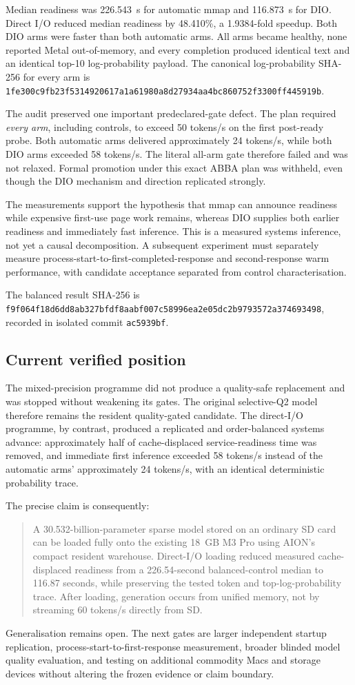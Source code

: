 Median readiness was 226.543~s for automatic mmap and 116.873~s for DIO.
Direct I/O reduced median readiness by 48.410\%, a 1.9384-fold speedup.  Both
DIO arms were faster than both automatic arms.  All arms became healthy, none
reported Metal out-of-memory, and every completion produced identical text and
an identical top-10 log-probability payload.  The canonical log-probability
SHA-256 for every arm is
\texttt{1fe300c9fb23f5314920617a1a61980a8d27934aa4bc860752f3300ff445919b}.

The audit preserved one important predeclared-gate defect.  The plan required
\emph{every arm}, including controls, to exceed 50 tokens/s on the first
post-ready probe.  Both automatic arms delivered approximately 24 tokens/s,
while both DIO arms exceeded 58 tokens/s.  The literal all-arm gate therefore
failed and was not relaxed.  Formal promotion under this exact ABBA plan was
withheld, even though the DIO mechanism and direction replicated strongly.

The measurements support the hypothesis that mmap can announce readiness
while expensive first-use page work remains, whereas DIO supplies both earlier
readiness and immediately fast inference.  This is a measured systems
inference, not yet a causal decomposition.  A subsequent experiment must
separately measure process-start-to-first-completed-response and second-response
warm performance, with candidate acceptance separated from control
characterisation.

The balanced result SHA-256 is
\texttt{f9f064f18d6dd8ab327bfdf8aabf007c58996ea2e05dc2b9793572a374693498},
recorded in isolated commit \texttt{ac5939bf}.

\subsection{Current verified position}

The mixed-precision programme did not produce a quality-safe replacement and
was stopped without weakening its gates.  The original selective-Q2 model
therefore remains the resident quality-gated candidate.  The direct-I/O
programme, by contrast, produced a replicated and order-balanced systems
advance: approximately half of cache-displaced service-readiness time was
removed, and immediate first inference exceeded 58 tokens/s instead of the
automatic arms' approximately 24 tokens/s, with an identical deterministic
probability trace.

The precise claim is consequently:
\begin{quote}
A 30.532-billion-parameter sparse model stored on an ordinary SD card can be
loaded fully onto the existing 18~GB M3 Pro using AION's compact resident
warehouse.  Direct-I/O loading reduced measured cache-displaced readiness from
a 226.54-second balanced-control median to 116.87 seconds, while preserving the
tested token and top-log-probability trace.  After loading, generation occurs
from unified memory, not by streaming 60 tokens/s directly from SD.
\end{quote}

Generalisation remains open.  The next gates are larger independent startup
replication, process-start-to-first-response measurement, broader blinded model
quality evaluation, and testing on additional commodity Macs and storage
devices without altering the frozen evidence or claim boundary.

